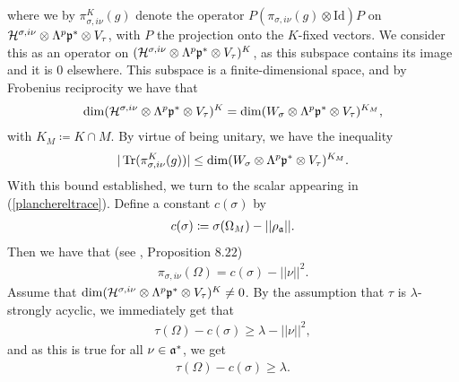 where we by $\pi_{\sigma,i\nu}^K(g)$ denote the operator $P(\pi_{\sigma,i\nu}(g)\otimes \text{Id})P$ on $\mathcal{H}^{\sigma,i\nu}\otimes \Lambda^p\mathfrak{p}^*\otimes V_\tau$, with $P$ the projection onto the $K$-fixed vectors. We consider this as an operator on $(\mathcal{H}^{\sigma,i\nu}\otimes \Lambda^p\mathfrak{p}^*\otimes V_\tau)^K$, as this subspace contains its image and it is $0$ elsewhere. This subspace is a finite-dimensional space, and by Frobenius reciprocity we have that
\begin{align*}
    \operatorname{dim}(\mathcal{H}^{\sigma,i\nu}\otimes \Lambda^p\mathfrak{p}^*\otimes V_\tau)^K = \operatorname{dim}(W_\sigma\otimes \Lambda^p\mathfrak{p}^*\otimes V_\tau)^{K_M},
\end{align*}
with $K_M\coloneqq K\cap M$. By virtue of being unitary, we have the inequality
\begin{align}\label{dimupper}
    |\operatorname{Tr}(\pi_{\sigma,i\nu}^K(g))|\leq \operatorname{dim}(W_\sigma\otimes \Lambda^p\mathfrak{p}^*\otimes V_\tau)^{K_M}.
\end{align}
With this bound established, we turn to the scalar appearing in (\ref{planchereltrace}). Define a constant $c(\sigma)$ by
\begin{align*}
    c(\sigma) \coloneqq \sigma(\Omega_M)-||\rho_{\mathfrak{a}}||.
\end{align*}
Then we have that (see \cite{Knapp}, Proposition $8.22$)
\begin{align*}
    \pi_{\sigma,i\nu}(\Omega) = c(\sigma)-||\nu||^2.
\end{align*}
Assume that $\operatorname{dim}(\mathcal{H}^{\sigma,i\nu}\otimes \Lambda^p\mathfrak{p}^*\otimes V_\tau)^K\neq 0$. By the assumption that $\tau$ is $\lambda$-strongly acyclic, we immediately get that
\begin{align*}
    \tau(\Omega)-c(\sigma)\geq \lambda-||\nu||^2,
\end{align*}
and as this is true for all $\nu\in\mathfrak{a}^*$, we get
\begin{align}\label{gap}
    \tau(\Omega)-c(\sigma)\geq \lambda.
\end{align}

